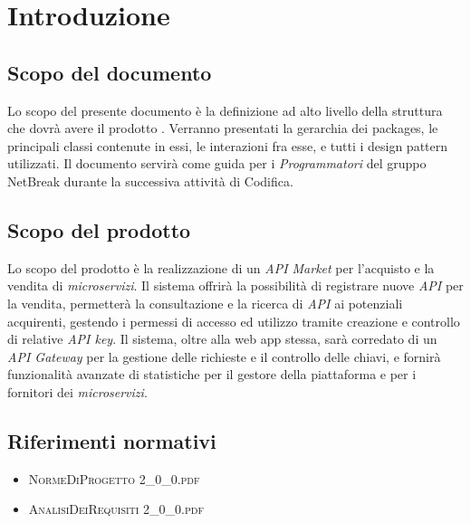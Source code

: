 \newpage
\section{Introduzione}

\subsection{Scopo del documento}
Lo scopo del presente documento è la definizione ad alto livello della struttura che dovrà avere il prodotto \progetto. Verranno presentati la gerarchia dei packages, le principali classi contenute in essi, le interazioni fra esse, e tutti i design pattern utilizzati. Il documento servirà come guida per i \textit{Programmatori} del gruppo NetBreak durante la successiva attività di Codifica.

\subsection{Scopo del prodotto}
Lo scopo del prodotto è la realizzazione di un \textit{API Market} per l'acquisto e la vendita di \textit{microservizi}. Il sistema offrirà la possibilità di registrare nuove \textit{API} per la vendita, permetterà la consultazione e la ricerca di \textit{API} ai potenziali acquirenti, gestendo i permessi di accesso ed utilizzo tramite creazione e controllo di relative \textit{API key}. Il sistema, oltre alla web app stessa, sarà corredato di un \textit{API Gateway} per la gestione delle richieste e il controllo delle chiavi, e fornirà funzionalità avanzate di statistiche per il gestore della piattaforma e per i fornitori dei \textit{microservizi}.

\subsection{Riferimenti normativi}
\begin{itemize}
	\item \textsc{NormeDiProgetto 2\_0\_0.pdf}
	\item \textsc{AnalisiDeiRequisiti 2\_0\_0.pdf}
\end{itemize}

